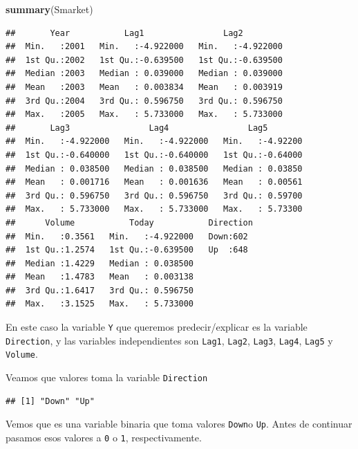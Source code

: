 \documentclass[]{book}
\newenvironment{Shaded}{\begin{snugshade}}{\end{snugshade}}
\newcommand{\KeywordTok}[1]{\textcolor[rgb]{0.13,0.29,0.53}{\textbf{#1}}}
\newcommand{\NormalTok}[1]{#1}
\newcommand{\OperatorTok}[1]{\textcolor[rgb]{0.81,0.36,0.00}{\textbf{#1}}}
\begin{document}
\begin{Shaded}
\begin{Highlighting}[]
\KeywordTok{summary}\NormalTok{(Smarket)}
\end{Highlighting}
\end{Shaded}

\begin{verbatim}
##       Year           Lag1                Lag2          
##  Min.   :2001   Min.   :-4.922000   Min.   :-4.922000  
##  1st Qu.:2002   1st Qu.:-0.639500   1st Qu.:-0.639500  
##  Median :2003   Median : 0.039000   Median : 0.039000  
##  Mean   :2003   Mean   : 0.003834   Mean   : 0.003919  
##  3rd Qu.:2004   3rd Qu.: 0.596750   3rd Qu.: 0.596750  
##  Max.   :2005   Max.   : 5.733000   Max.   : 5.733000  
##       Lag3                Lag4                Lag5         
##  Min.   :-4.922000   Min.   :-4.922000   Min.   :-4.92200  
##  1st Qu.:-0.640000   1st Qu.:-0.640000   1st Qu.:-0.64000  
##  Median : 0.038500   Median : 0.038500   Median : 0.03850  
##  Mean   : 0.001716   Mean   : 0.001636   Mean   : 0.00561  
##  3rd Qu.: 0.596750   3rd Qu.: 0.596750   3rd Qu.: 0.59700  
##  Max.   : 5.733000   Max.   : 5.733000   Max.   : 5.73300  
##      Volume           Today           Direction 
##  Min.   :0.3561   Min.   :-4.922000   Down:602  
##  1st Qu.:1.2574   1st Qu.:-0.639500   Up  :648  
##  Median :1.4229   Median : 0.038500             
##  Mean   :1.4783   Mean   : 0.003138             
##  3rd Qu.:1.6417   3rd Qu.: 0.596750             
##  Max.   :3.1525   Max.   : 5.733000
\end{verbatim}

En este caso la variable \texttt{Y} que queremos predecir/explicar es la variable \texttt{Direction}, y las variables independientes son \texttt{Lag1}, \texttt{Lag2}, \texttt{Lag3}, \texttt{Lag4}, \texttt{Lag5} y \texttt{Volume}.

Veamos que valores toma la variable \texttt{Direction}

\begin{Shaded}
\end{Shaded}

\begin{verbatim}
## [1] "Down" "Up"
\end{verbatim}

Vemos que es una variable binaria que toma valores \texttt{Down}o \texttt{Up}.
Antes de continuar pasamos esos valores a \texttt{0} o \texttt{1}, respectivamente.
\end{document}
